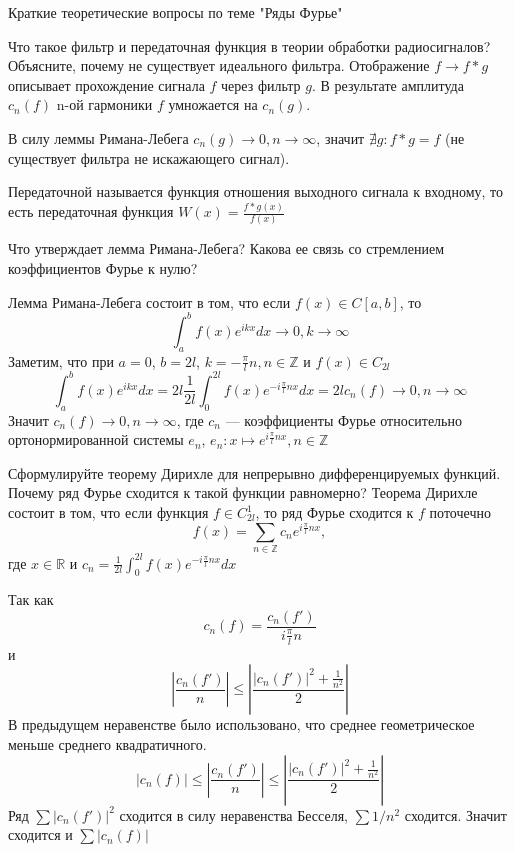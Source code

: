 \documentclass{article}
\begin{document}
\begin{section}{Краткие теоретические вопросы по теме "Ряды Фурье"}
\begin{subsection}{Что такое фильтр и передаточная функция в теории обработки радиосигналов? Объясните, почему не существует идеального фильтра.}
Отображение $f \rightarrow f*g$ описывает прохождение сигнала $f$ через фильтр $g$. 
В результате амплитуда $c_n(f)$ n-ой гармоники $f$ умножается на $c_n(g)$.

В силу леммы Римана-Лебега $c_n(g)\rightarrow 0, n\rightarrow \infty$, значит $\nexists g: f*g=f$ (не существует фильтра не искажающего сигнал).

Передаточной называется функция отношения выходного сигнала к входному, то есть передаточная функция $ W(x) = \frac{f*g(x)}{f(x)} $ 
\end{subsection}


\begin{subsection}{Что утверждает лемма Римана-Лебега? Какова ее связь со стремлением коэффициентов Фурье к нулю?}

Лемма Римана-Лебега состоит в том, что если $f(x)\in C[a,b]$, то
\[\int_a^b f(x)e^{ikx}dx \rightarrow 0, k \rightarrow \infty\]
Заметим, что при $a = 0$, $b = 2l$, $k=-\frac{\pi}{l}n, n \in \mathbb{Z}$ и $f(x)\in C_{2l}$ 
\[\int_a^b f(x)e^{ikx}dx = 2l \frac{1}{2l}\int_0^{2l}f(x)e^{-i\frac{\pi}{l}nx}dx = 2lc_n(f) \rightarrow 0, n \rightarrow  \infty\]
Значит $c_n(f) \rightarrow 0, n \rightarrow  \infty$, 
где $c_n$ --- коэффициенты Фурье относительно ортонормированной системы ${e_n}$, $e_n: x \mapsto e^{i\frac{\pi}{l}nx}, n \in \mathbb{Z}$
\end{subsection}


\begin{subsection}{Сформулируйте теорему Дирихле для непрерывно дифференцируемых функций. Почему ряд Фурье сходится к такой функции равномерно?}
Теорема Дирихле состоит в том, что если функция $f \in C_{2l}^1$, то ряд Фурье сходится к $f$ поточечно
\[f(x)=\sum_{n \in \mathbb{Z}} c_n e^{i\frac{\pi}{l}nx}, \]
где $x \in \mathbb{R}$ и $c_n = \frac{1}{2l}\int_0^{2l}f(x)e^{-i\frac{\pi}{l}nx}dx$

Так как
\[ c_n(f) = \frac{c_n(f')}{i\frac{\pi}{l}n} \]
и \[ \left| \frac{c_n(f')}{n} \right| \leq \left|\frac{|c_n(f')|^2 + \frac{1}{n^2}}{2}\right|\]
В предыдущем неравенстве было использовано, что среднее геометрическое меньше среднего квадратичного.
\[ |c_n(f)| \leq \left| \frac{c_n(f')}{n} \right| \leq \left|\frac{|c_n(f')|^2 + \frac{1}{n^2}}{2}\right|\] 
Ряд $\sum |c_n(f')|^2$ сходится в силу неравенства Бесселя, $\sum 1/n^2$ сходится. Значит сходится и $\sum |c_n(f)|$ 
\end{subsection}



\end{section}
\end{document}

